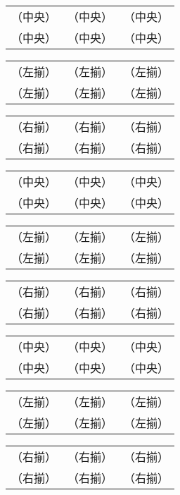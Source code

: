 \documentclass[twocolumn]{tarticle}
\begin{document}
\begin{tabular}{|c|c|c|}
（中央）&（中央）&（中央）\\
（中央）&（中央）&（中央）
\end{tabular}

\begin{tabular}{|l|l|l|}
（左揃）&（左揃）&（左揃）\\
（左揃）&（左揃）&（左揃）
\end{tabular}

\begin{tabular}{|r|r|r|}
（右揃）&（右揃）&（右揃）\\
（右揃）&（右揃）&（右揃）
\end{tabular}

\begin{tabular}{|c|c|c|}
（中央） & （中央） & （中央） \\
（中央） & （中央） & （中央）
\end{tabular}

\begin{tabular}{|l|l|l|}
（左揃） & （左揃） & （左揃） \\
（左揃） & （左揃） & （左揃）
\end{tabular}

\begin{tabular}{|r|r|r|}
（右揃） & （右揃） & （右揃） \\
（右揃） & （右揃） & （右揃）
\end{tabular}


\begin{tabular}{|c|c|c|}
\mbox{（中央）}&\mbox{（中央）}&\mbox{（中央）}\\
\mbox{（中央）}&\mbox{（中央）}&\mbox{（中央）}
\end{tabular}

\begin{tabular}{|l|l|l|}
\mbox{（左揃）}&\mbox{（左揃）}&\mbox{（左揃）}\\
\mbox{（左揃）}&\mbox{（左揃）}&\mbox{（左揃）}
\end{tabular}

\begin{tabular}{|r|r|r|}
\mbox{（右揃）}&\mbox{（右揃）}&\mbox{（右揃）}\\
\mbox{（右揃）}&\mbox{（右揃）}&\mbox{（右揃）}
\end{tabular}
\end{document}
